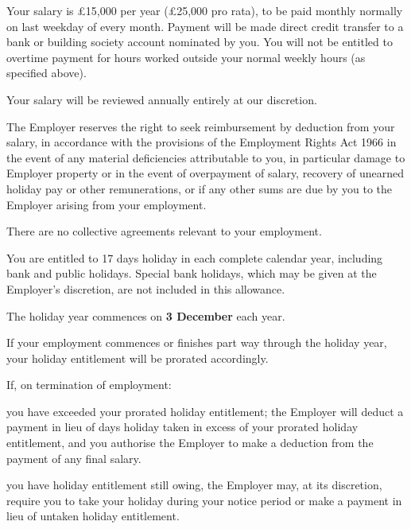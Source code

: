 \documentclass[a4paper,11pt,onecolumn ]{article}
\begin{document}
\begin{legal}
\item {}
\begin{legal}
\item Your salary is £15,000 per year (£25,000 pro rata), to be paid monthly normally on 
last weekday of every month. Payment will be made direct credit transfer to a bank or
building society account nominated by you. You will not be entitled to overtime
payment for hours worked outside your normal weekly hours (as specified
above).
\item Your salary will be reviewed annually entirely at our discretion.
\item The Employer reserves the right to seek reimbursement by deduction from your
salary, in accordance with the provisions of the Employment Rights Act 1966 in
the event of any material deficiencies attributable to you, in particular damage
to Employer property or in the event of overpayment of salary, recovery of
unearned holiday pay or other remunerations, or if any other sums are due by
you to the Employer arising from your employment.
\end{legal}


\item {}
There are no collective agreements relevant to your employment.

\item {}
\begin{legal}
\item You are entitled to 17 days holiday in each complete calendar year, 
including bank and public holidays. Special bank holidays, which may be given at the
Employer's discretion, are not included in this allowance. 
\item The holiday year commences on \textbf{3 December} each year.
\item If your employment commences or finishes part way through the holiday year,
your holiday entitlement will be prorated accordingly.

\item If, on termination of employment:

\begin{legal}
  \item you have exceeded your prorated holiday entitlement; the Employer will
  deduct a payment in lieu of days holiday taken in excess of your prorated
  holiday entitlement, and you authorise the Employer to make a deduction
  from the payment of any final salary.
  \item you have holiday entitlement still owing, the Employer may, at its
  discretion, require you to take your holiday during your notice period or
  make a payment in lieu of untaken holiday entitlement.
\end{legal}


\end{legal}
\end{legal}
\end{document}
